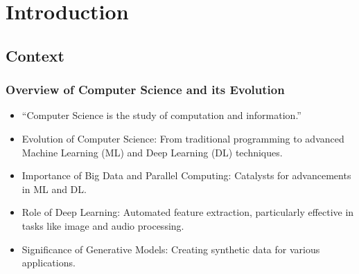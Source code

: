 \section{Introduction}

\subsection{Context}

\begin{frame}
    \frametitle{Overview of Computer Science and its Evolution}
    \begin{itemize}
        \item ``Computer Science is the study of computation and information.''~\cite{university_of_york_what_nodate}
        \item Evolution of Computer Science: From traditional programming to advanced Machine Learning (ML) and Deep Learning (DL) techniques.
        \item Importance of Big Data and Parallel Computing: Catalysts for advancements in ML and DL.
        \item Role of Deep Learning: Automated feature extraction, particularly effective in tasks like image and audio processing.
        \item Significance of Generative Models: Creating synthetic data for various applications.
    \end{itemize}

\end{frame}

